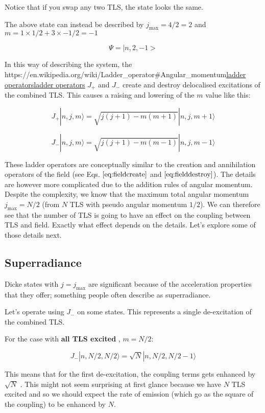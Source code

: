 \documentclass[
]{article}
\let\oldhref\href
\renewcommand{\href}[2]{\ifx#1\urlprefix\oldhref{#1}{#2}\else\uline{\oldhref{#1}{#2}}\fi}
\renewcommand{\[}{\begin{equation}}
\renewcommand{\]}{\end{equation}}
\begin{document}
Notice that if you swap any two TLS, the state looks the same.

The above state can instead be described by \(j_{\max}= 4/2  = 2\) and
\(m = 1\times 1/2 + 3\times -1/2 =-1\)

\[
\Psi = |n,2,-1>
\]

In this way of describing the system, the
\href{https://en.wikipedia.org/wiki/Ladder_operator\#Angular_momentum}{ladder
operators} \(J_{+}\) and \(J_{-}\) create and destroy delocalised
excitations of the combined TLS. This causes a raising and lowering of
the \(m\) value like this:

\[
J_+ |n, j, m\rangle  =  \sqrt{j(j + 1) - m(m + 1)} |n, j, m + 1\rangle
\]

\[
J_- |n, j, m\rangle =  \sqrt{j(j + 1) - m(m - 1)} |n, j, m - 1\rangle
\]

These ladder operators are conceptually similar to the creation and
annihilation operators of the field (see Eqs. \(\ref{eq:fieldcreate}\)
and \(\ref{eq:fielddestroy}\)). The details are however more complicated
due to the addition rules of angular momentum. Despite the complexity,
we know that the maximum total angular momentum \(j_{\max} = N/2\) (from
\(N\) TLS with pseudo angular momentum \(1/2\)). We can therefore see
that the number of TLS is going to have an effect on the coupling
between TLS and field. Exactly what effect depends on the details. Let's
explore some of those details next.

\subsection{Superradiance}\label{superradiance}

Dicke states with \(j=j_{\max}\) are significant because of the
acceleration properties that they offer; something people often describe
as superradiance.

Let's operate using \(J_-\) on some states. This represents a single
de-excitation of the combined TLS.

For the case with \textbf{all TLS excited} , \(m=N/2\):

\[
J_- |n, N/2, N/2\rangle  = \sqrt{N} |n, N/2, N/2 - 1\rangle
\]

This means that for the first de-excitation, the coupling terms gets
enhanced by \(\sqrt{N}\) . This might not seem surprising at first
glance because we have \(N\) TLS excited and so we should expect the
rate of emission (which go as the square of the coupling) to be enhanced
by \(N\).
\end{document}
